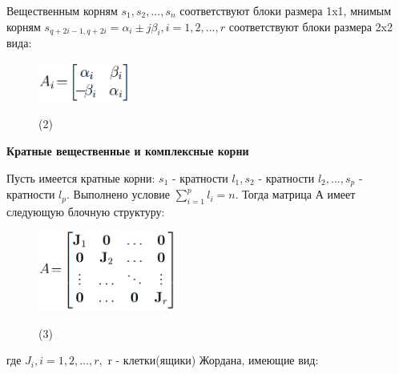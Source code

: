 \documentclass[12pt,a4paper,oneside]{article}
\begin{document}
Вещественным корням $s_1,s_2,...,s_n$ соответствуют блоки размера 1x1, мнимым корням $s_{q+2i-1,q+2i}=\alpha_i\pm j\beta_i,i=1,2,...,r$ соответствуют блоки размера 2x2 вида:
\begin{figure}[H]
	\centering
	\begin{minipage}{.2\textwidth}
		\centering
		\includegraphics[width=3cm]{Drawable/2}
	\end{minipage}%
	\begin{minipage}{.2\textwidth}
		\centering
		(2)
	\end{minipage}
\end{figure}
\textbf{Кратные вещественные и комплексные корни}

Пусть имеется кратные корни: $s_1$ - кратности $l_1,s_2$ - кратности $l_2,...,s_p$ - кратности $l_p$. Выполнено условие $\sum_{i=1}^{p}l_i=n$. Тогда матрица А имеет следующую блочную структуру:

\begin{figure}[H]
	\centering
	\begin{minipage}{.25\textwidth}
		\centering
		\includegraphics[width=4.5cm]{Drawable/3}
	\end{minipage}%
	\begin{minipage}{.25\textwidth}
		\centering
		(3)
	\end{minipage}
\end{figure}
где $J_i, i=1,2,...,r,$ r - клетки(ящики) Жордана, имеющие вид: 
\end{document}
